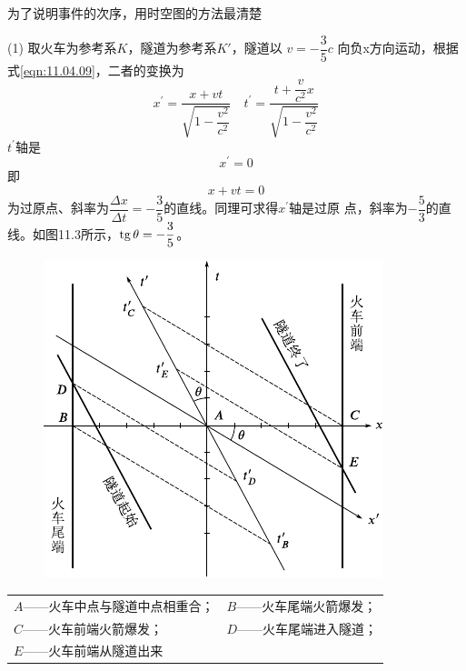 \solution 为了说明事件的次序，用时空图的方法最清楚

(1) 取火车为参考系$ K $，隧道为参考系$ K' $，隧道以
$ v = - \dfrac { 3 } { 5 } c   $
向负x方向运动，根据式\eqref{eqn:11.04.09}，二者的变换为
\begin{equation*}
    x^{\prime}=\frac{x+v t}{\sqrt{1-\dfrac{v^{2}}{c^{2}}}} \quad t^{\prime}=\frac{t+\dfrac{v}{c^{2}} x}{\sqrt{1-\dfrac{v^{2}}{c^{2}}}}
\end{equation*}
$ t ^ { \prime } $轴是
\begin{equation*}
    x ^ { \prime } = 0
\end{equation*}
即
\begin{equation*}
    x + v t = 0
\end{equation*}
为过原点、斜率为$ \dfrac { \Delta x } { \Delta t } = - \dfrac { 3 } { 5 }  $的直线。同理可求得$ x ^ { \prime } $轴是过原
点，斜率为$  - \dfrac { 5 } { 3 }   $的直线。如图11.3所示，$  \operatorname{tg} \theta = - \dfrac { 3 } { 5 }  $。

\clearpage
\begin{figure}[h]
    \centering
    \includegraphics{figure/fig11.03}
    \caption{}
    \label{fig:11.03}
\end{figure}

\begin{center}
    \begin{tabular}{ll}
        $ A $——火车中点与隧道中点相重合； & $ B $——火车尾端火箭爆发； \\
        $ C $——火车前端火箭爆发； & $ D $——火车尾端进入隧道； \\
        $ E $——火车前端从隧道出来 &  \\
    \end{tabular}
\end{center}


